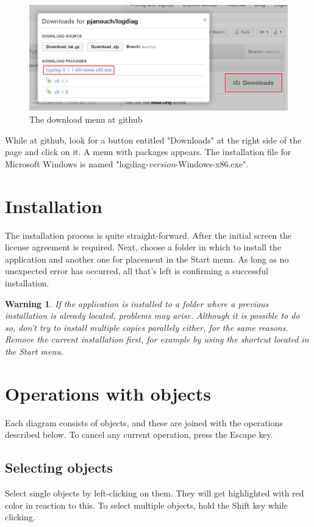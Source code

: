 \documentclass[12pt,oneside,a4paper,titlepage,final]{article}
\theoremstyle{note}
\newtheorem*{warning}{Warning}
\newcommand*{\uv}[1]{"#1"}
\begin{document}
\begin{figure}[ht]
	\centering
	\includegraphics[width=\textwidth,keepaspectratio]{github}
	\caption{The download menu at github}
	\label{github-download}
\end{figure}

While at github, look for a button entitled \uv{Downloads} at the right side of the page and click on it. A menu with packages appears. The installation file for Microsoft Windows is named \uv{logdiag-\emph{version}-Windows-x86.exe}.

\section{Installation}
The installation process is quite straight-forward. After the initial screen the license agreement is required. Next, choose a folder in which to install the application and another one for placement in the Start menu. As long as no unexpected error has occurred, all that's left is confirming a successful installation.

\begin{warning}
	If the application is installed to a folder where a previous installation is already located, problems may arise. Although it is possible to do so, don't try to install multiple copies parallely either, for the same reasons. Remove the current installation first, for example by using the shortcut located in the Start menu.
\end{warning}

\section{Operations with objects}
Each diagram consists of objects, and these are joined with the operations described below. To cancel any current operation, press the Escape key.

\subsection{Selecting objects}
Select single objects by left-clicking on them. They will get highlighted with red color in reaction to this. To select multiple objects, hold the Shift key while clicking.
\end{document}
